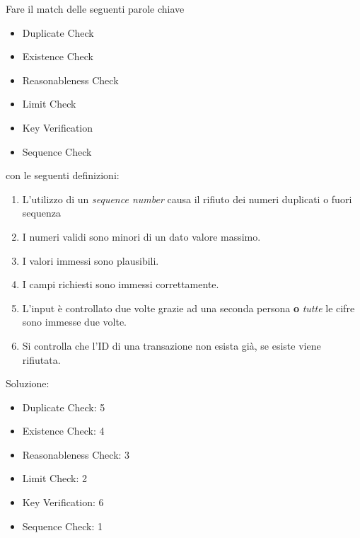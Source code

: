 \begin{Exercise} [
  title={Match definizioni},
  label={esCs7}
  ]

  \Question

  Fare il match delle seguenti parole chiave
  \begin{itemize}
   \item Duplicate Check
   \item Existence Check
   \item Reasonableness Check
   \item Limit Check
   \item Key Verification
   \item Sequence Check
  \end{itemize}

  con le seguenti definizioni:
  \begin{enumerate}
   \item L'utilizzo di un \textit{sequence number} causa il rifiuto
   dei numeri duplicati o fuori sequenza 
   \item I numeri validi sono minori di un dato valore massimo.
   \item I valori immessi sono plausibili.
   \item I campi richiesti sono immessi correttamente.
   \item L'input è controllato due volte grazie ad una seconda persona
   \textbf{o} \emph{tutte} le cifre sono immesse due volte.
   \item Si controlla che l'ID di una transazione non esista già, se
   esiste viene rifiutata.
  \end{enumerate}

\end{Exercise}

\begin{Answer} [
  ref={esCs7},
  number={7}
  ]

  \Question Soluzione:
  \begin{itemize}
   \item Duplicate Check: 5
   \item Existence Check: 4
   \item Reasonableness Check: 3
   \item Limit Check: 2
   \item Key Verification: 6
   \item Sequence Check: 1
  \end{itemize}


\end{Answer}
